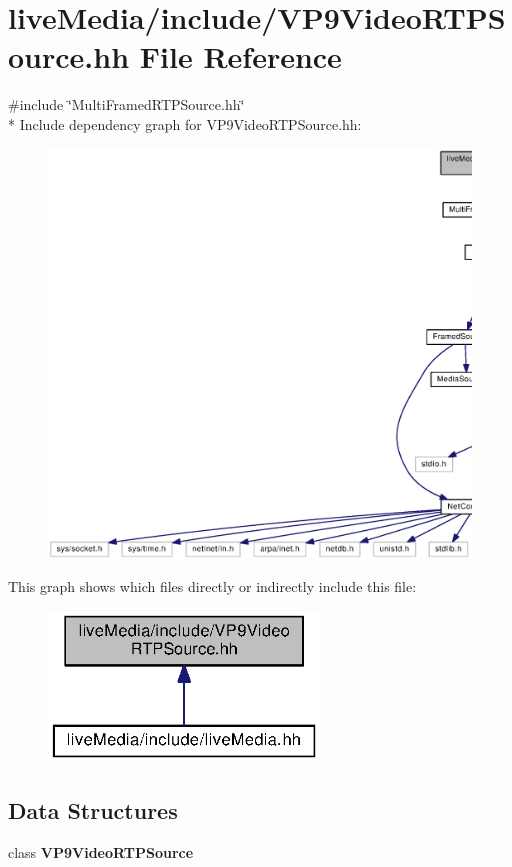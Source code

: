 \section{live\+Media/include/\+V\+P9\+Video\+R\+T\+P\+Source.hh File Reference}
\label{VP9VideoRTPSource_8hh}
{\ttfamily \#include \char`\"{}Multi\+Framed\+R\+T\+P\+Source.\+hh\char`\"{}}\\*
Include dependency graph for V\+P9\+Video\+R\+T\+P\+Source.\+hh\+:
\nopagebreak
\begin{figure}[H]
\begin{center}
\leavevmode
\includegraphics[width=350pt]{VP9VideoRTPSource_8hh__incl}
\end{center}
\end{figure}
This graph shows which files directly or indirectly include this file\+:
\nopagebreak
\begin{figure}[H]
\begin{center}
\leavevmode
\includegraphics[width=204pt]{VP9VideoRTPSource_8hh__dep__incl}
\end{center}
\end{figure}
\subsection*{Data Structures}
\begin{DoxyCompactItemize}
\item 
class {\bf V\+P9\+Video\+R\+T\+P\+Source}
\end{DoxyCompactItemize}
